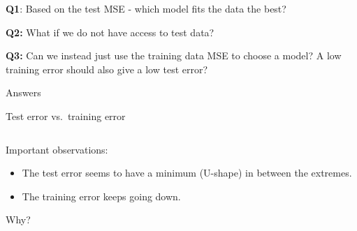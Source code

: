\documentclass[ignorenonframetext,]{beamer}
\providecommand{\tightlist}{%
  \setlength{\itemsep}{0pt}\setlength{\parskip}{0pt}}
\begin{document}
\begin{frame}

\textbf{Q1}: Based on the test MSE - which model fits the data the best?

\vspace{2mm}

\textbf{Q2:} What if we do not have access to test data?

\vspace{2mm}

\textbf{Q3:} Can we instead just use the training data MSE to choose a
model? A low training error should also give a low test error?

\vspace{2mm}

\end{frame}

\begin{frame}

Answers

\end{frame}

\begin{frame}

\begin{block}{Test error vs.~training error}

\(~\)

Important observations:

\vspace{2mm}

\begin{itemize}
\tightlist
\item
  The test error seems to have a minimum (U-shape) in between the
  extremes.
\end{itemize}

\vspace{2mm}

\begin{itemize}
\tightlist
\item
  The training error keeps going down.
\end{itemize}

\vspace{1.5cm}
\centering

Why?

\end{block}

\end{frame}
\end{document}
